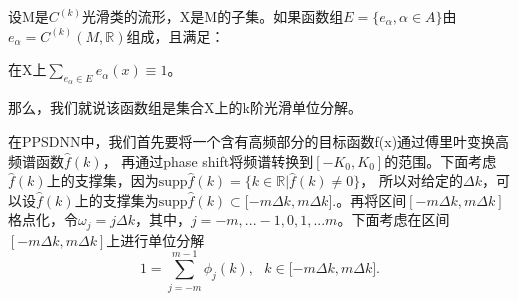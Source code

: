 \begin{thm}
设M是$C^{(k)}$光滑类的流形，X是M的子集。如果函数组$E= \{e_{\alpha},\alpha \in A\}$由$e_{\alpha} = C^{(k)}(M,\mathbb{R})$组成，且满足：

在X上$\sum_{e_{\alpha }\in E}^{}e_{\alpha }(x)\equiv 1 $。

那么，我们就说该函数组是集合X上的k阶光滑单位分解。
\end{thm}
在PPSDNN中，我们首先要将一个含有高频部分的目标函数f(x)通过傅里叶变换高频谱函数$\hat{f}(k)$，
再通过phase shift将频谱转换到$[-K_0,K_0]$的范围。下面考虑
$\widehat{f}(k)$上的支撑集，因为$\text{supp}\widehat{f}(k)=\{k \in \mathbb{R}|\widehat{f}(k)\ne 0\}$，
所以对给定的$\Delta k$，可以设$\widehat{f}(k)$上的支撑集为$\text{supp}\widehat{f}(k)\subset\lbrack-m\Delta k,m\Delta k].$。再将区间$[-m\Delta k,m\Delta k]$格点化，令$\omega _j = j \Delta k$，其中，$j = -m,...-1,0,1,...m$。下面考虑在区间$[-m\Delta k,m\Delta k]$上进行单位分解
\begin{equation}
1=%
{\displaystyle\sum\limits_{j=-m}^{m-1}}
\phi_{j}(k),\text{ }k\in\lbrack -m\Delta k,m\Delta k].\label{pou}%
\end{equation}

